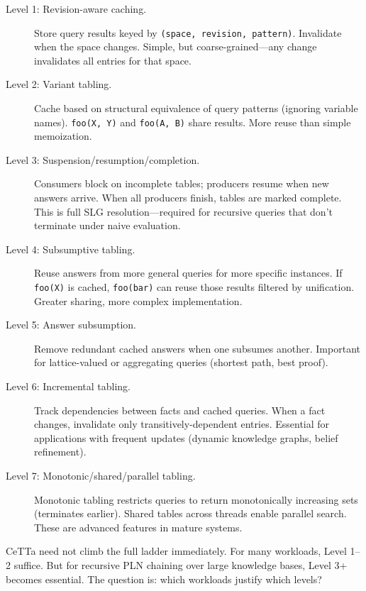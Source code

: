 \documentclass[11pt]{article}
\newcommand{\code}[1]{\texttt{#1}}
\newcommand{\CeTTa}{\textup{CeTTa}}
\begin{document}
\begin{description}
\item[Level 1: Revision-aware caching.]
  Store query results keyed by \code{(space, revision, pattern)}.
  Invalidate when the space changes.  Simple, but coarse-grained---any
  change invalidates all entries for that space.

\item[Level 2: Variant tabling.]
  Cache based on structural equivalence of query patterns (ignoring
  variable names).  \code{foo(X, Y)} and \code{foo(A, B)} share results.
  More reuse than simple memoization.

\item[Level 3: Suspension/resumption/completion.]
  Consumers block on incomplete tables; producers resume when new answers
  arrive.  When all producers finish, tables are marked complete.  This
  is full SLG resolution---required for recursive queries that don't
  terminate under naive evaluation.

\item[Level 4: Subsumptive tabling.]
  Reuse answers from more general queries for more specific instances.
  If \code{foo(X)} is cached, \code{foo(bar)} can reuse those results
  filtered by unification.  Greater sharing, more complex implementation.

\item[Level 5: Answer subsumption.]
  Remove redundant cached answers when one subsumes another.  Important
  for lattice-valued or aggregating queries (shortest path, best proof).

\item[Level 6: Incremental tabling.]
  Track dependencies between facts and cached queries.  When a fact
  changes, invalidate only transitively-dependent entries.  Essential
  for applications with frequent updates (dynamic knowledge graphs,
  belief refinement).

\item[Level 7: Monotonic/shared/parallel tabling.]
  Monotonic tabling restricts queries to return monotonically increasing
  sets (terminates earlier).  Shared tables across threads enable
  parallel search.  These are advanced features in mature systems.
\end{description}

\CeTTa{} need not climb the full ladder immediately.  For many workloads,
Level 1--2 suffice.  But for recursive PLN chaining over large knowledge
bases, Level 3+ becomes essential.  The question is: which workloads
justify which levels?
\end{document}
